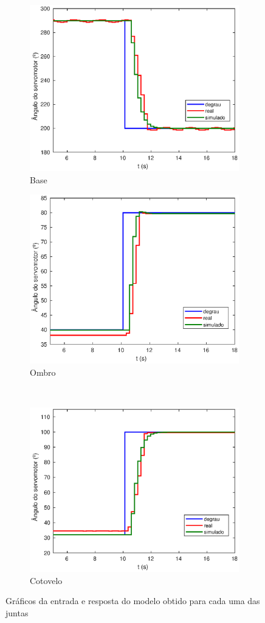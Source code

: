 \begin{figure}[h!]
  
  \centering
  \begin{subfigure}{.5\textwidth}
    \centering
    \includegraphics[width = .8\columnwidth]{Imagens/base_ma_simul}
    \caption{Base}
    \label{fig:base_ma_simul}
  \end{subfigure}%
  \begin{subfigure}{.5\textwidth}
    \centering
    \includegraphics[width = .8\columnwidth]{Imagens/shoulder_ma_simul}
    \caption{Ombro}
    \label{fig:shoulder_ma_simul}
  \end{subfigure}%
  \\
  \begin{subfigure}{\textwidth}
    \centering
    \includegraphics[width = 0.4\columnwidth]{Imagens/forearm_ma_simul}
    \caption{Cotovelo}
    \label{fig:forearm_ma_simul}
  \end{subfigure}%
  \caption{Gráficos da entrada e resposta do modelo obtido para cada uma das juntas}
  \label{fig:ensaioMalhaAbertaSimul} 

\end{figure}

